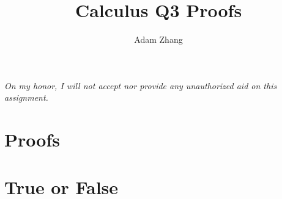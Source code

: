 \documentclass[11pt]{article}
\title{Calculus Q3 Proofs}
\author{Adam Zhang}
\begin{document}
\pagestyle{fancy}

\begin{center}
  \emph{On my honor, I will not accept nor provide any unauthorized aid on this assignment.}
\end{center}

\section*{Proofs}

\section*{True or False}
\end{document}
